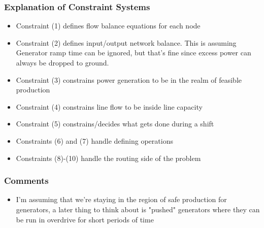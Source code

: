 \documentclass{article}
\begin{document}
	\subsubsection{Explanation of Constraint Systems}
	\begin{itemize}
		\item Constraint (1) defines flow balance equations for each node
		\item Constraint (2) defines input/output network balance. This is assuming Generator ramp time can be ignored, but that's fine since excess power can always be dropped to ground.
		\item Constraint (3) constrains power generation to be in the realm of feasible production
		\item Constraint (4) constrains line flow to be inside line capacity
		\item Constraint (5) constrains/decides what gets done during a shift
		\item Constraints (6) and (7) handle defining operations
		\item Constraints (8)-(10) handle the routing side of the problem
	\end{itemize}
	\subsubsection{Comments}
	\begin{itemize}
		\item I'm assuming that we're staying in the region of safe production for generators, a later thing to think about is "pushed" generators where they can be run in overdrive for short periods of time
		\end{itemize}
		
\end{document}
